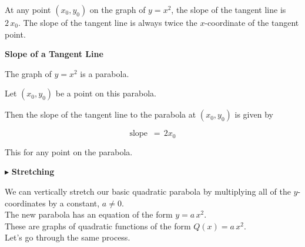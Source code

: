\documentclass{ximera}
\begin{document}
At any point $(x_0, y_0)$ on the graph of $y = x^2$, the slope of the tangent line is $2 \, x_0$.  The slope of the tangent line is always twice the $x$-coordinate of the tangent point.




\begin{conclusion} \textbf{\textcolor{green!50!black}{Slope of a Tangent Line}} 


The graph of $y = x^2$ is a parabola.

Let $(x_0, y_0)$ be a point on this parabola.

Then the slope of the tangent line to the parabola at $(x_0, y_0)$ is given by 



\[ \text{slope } \, = \, 2 x_0  \]


\end{conclusion}
This for any point on the parabola.



























$\blacktriangleright$ \textbf{Stretching}



We can vertically stretch our basic quadratic parabola by multiplying all of the $y$-coordinates by a constant, $a \ne 0$. \\


The new parabola has an equation of the form $y = a \, x^2$. \\

These are graphs of quadratic functions of the form $Q(x) = a \, x^2$. \\


Let's go through the same process. \\
\end{document}

